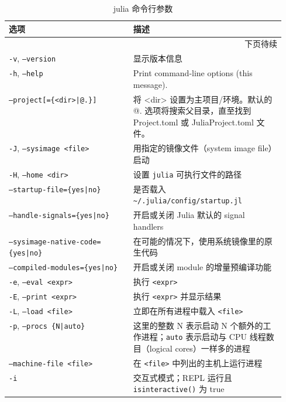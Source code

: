 \begin{longtable}{lp{0.55\linewidth}}
    \caption{julia 命令行参数} \label{julia_cmd_arg} \\
    \toprule
    \bf{选项} & \bf{描述} \\ 
    \hline \endhead
    \multicolumn{2}{r}{下页待续} \\ 
    \midrule \endfoot
    \bottomrule \endlastfoot

    \texttt{-v}, \texttt{--version} & 显示版本信息 \\ \hline
    \texttt{-h}, \texttt{--help} & Print command-line options (this message). \\ \hline
    \texttt{--project[=\{<dir>|@.\}]} & 将 <dir> 设置为主项目/环境。默认的 @. 选项将搜索父目录，直至找到 Project.toml 或 JuliaProject.toml 文件。 \\ \hline
    \texttt{-J}, \texttt{--sysimage <file>} & 用指定的镜像文件（system image file）启动 \\ \hline
    \texttt{-H}, \texttt{--home <dir>} & 设置 \texttt{julia} 可执行文件的路径 \\ \hline
    \texttt{--startup-file=\{yes|no\}} & 是否载入 \texttt{{\textasciitilde}/.julia/config/startup.jl} \\ \hline
    \texttt{--handle-signals=\{yes|no\}} & 开启或关闭 Julia 默认的 signal handlers \\ \hline
    \texttt{--sysimage-native-code=\{yes|no\}} & 在可能的情况下，使用系统镜像里的原生代码 \\ \hline
    \texttt{--compiled-modules=\{yes|no\}} & 开启或关闭 module 的增量预编译功能 \\ \hline
    \texttt{-e}, \texttt{--eval <expr>} & 执行 \texttt{<expr>} \\ \hline
    \texttt{-E}, \texttt{--print <expr>} & 执行 \texttt{<expr>} 并显示结果 \\ \hline
    \texttt{-L}, \texttt{--load <file>} & 立即在所有进程中载入 \texttt{<file>} \\ \hline
    \texttt{-p}, \texttt{--procs \{N|auto\}} & 这里的整数 N 表示启动 N 个额外的工作进程；\texttt{auto} 表示启动与 CPU 线程数目（logical cores）一样多的进程 \\ \hline
    \texttt{--machine-file <file>} & 在 \texttt{<file>} 中列出的主机上运行进程 \\ \hline
    \texttt{-i} & 交互式模式；REPL 运行且 \texttt{isinteractive()} 为 true \\ \hline

\end{longtable}
